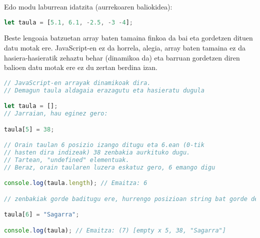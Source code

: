 Edo modu laburrean idatzita (aurrekoaren baliokidea):
 
\begin{minipage}{\linewidth}
\begin{lstlisting}[language=JavaScript]
let taula = [5.1, 6.1, -2.5, -3 -4];
\end{lstlisting}
\end{minipage}

 Beste lengoaia batzuetan array baten tamaina finkoa da bai eta gordetzen dituen datu motak ere. JavaScript-en ez da horrela, alegia, array baten tamaina ez da hasiera-hasieratik zehaztu behar (dinamikoa da) eta barruan gordetzen diren balioen datu motak ere ez du zertan berdina izan.
 
\begin{minipage}{\linewidth}
\begin{lstlisting}[language=JavaScript]
// JavaScript-en arrayak dinamikoak dira.
// Demagun taula aldagaia erazagutu eta hasieratu dugula

let taula = [];
// Jarraian, hau eginez gero:

taula[5] = 38; 

// Orain taulan 6 posizio izango ditugu eta 6.ean (0-tik
// hasten dira indizeak) 38 zenbakia aurkituko dugu. 
// Tartean, "undefined" elementuak.
// Beraz, orain taularen luzera eskatuz gero, 6 emango digu

console.log(taula.length); // Emaitza: 6

// zenbakiak gorde baditugu ere, hurrengo posizioan string bat gorde dezakegu, arazorik gabe (eta honekin, berriro, dinamikoki luzatu dugu arrayaren tamaina)

taula[6] = "Sagarra";

console.log(taula); // Emaitza: (7) [empty x 5, 38, "Sagarra"]

\end{lstlisting}
\end{minipage}
 
